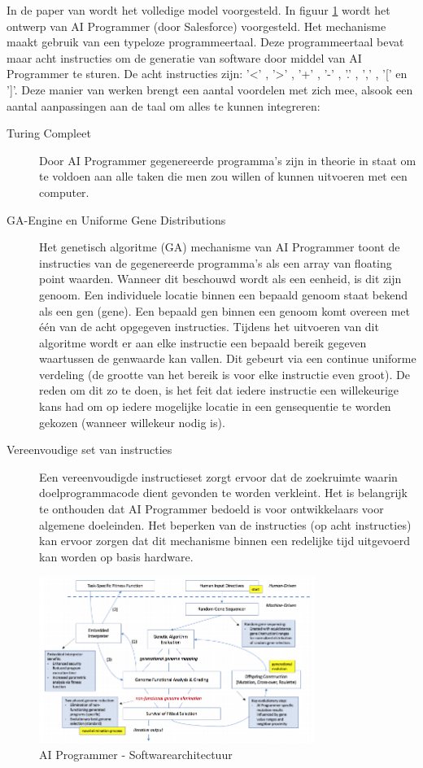 In de paper van \textcite{aiProgrammer} wordt het volledige model voorgesteld. In figuur \ref{fig:aiprog} wordt het ontwerp van AI Programmer (door Salesforce) voorgesteld. Het mechanisme maakt gebruik van een typeloze programmeertaal. Deze programmeertaal bevat maar acht instructies om de generatie van software door middel van AI Programmer te sturen. De acht instructies zijn: '<' , '>' , '+' , '-' , '.' , ',' , '[' en ']'. Deze manier van werken brengt een aantal voordelen met zich mee, alsook een aantal aanpassingen aan de taal om alles te kunnen integreren:
\begin{description}
	\item[Turing Compleet] Door AI Programmer gegenereerde programma’s zijn in theorie in staat om te voldoen aan alle taken die men zou willen of kunnen uitvoeren met een computer.
	\item[GA-Engine en Uniforme Gene Distributions] Het genetisch algoritme (GA) mechanisme van AI Programmer toont de instructies van de gegenereerde programma’s als een array van floating point waarden. Wanneer dit beschouwd wordt als een eenheid, is dit zijn genoom. Een individuele locatie binnen een bepaald genoom staat bekend als een gen (gene). Een bepaald gen binnen een genoom komt overeen met één van de acht opgegeven instructies. Tijdens het uitvoeren van dit algoritme wordt er aan elke instructie een bepaald bereik gegeven waartussen de genwaarde kan vallen. Dit gebeurt via een continue uniforme verdeling (de grootte van het bereik is voor elke instructie even groot). De reden om dit zo te doen, is het feit dat iedere instructie een willekeurige kans had om op iedere mogelijke locatie in een gensequentie te worden gekozen (wanneer willekeur nodig is).
	\item[Vereenvoudige set van instructies]  Een vereenvoudigde instructieset zorgt ervoor dat de zoekruimte waarin doelprogrammacode dient gevonden te worden verkleint. Het is belangrijk te onthouden dat AI Programmer bedoeld is voor ontwikkelaars voor algemene doeleinden. Het beperken van de instructies (op acht instructies) kan ervoor zorgen dat dit mechanisme binnen een redelijke tijd uitgevoerd kan worden op basis hardware.
\end{description}

\begin{figure}[htb]
	\centering
	\includegraphics[width=0.80\textwidth]{img/aiprogmodel}
	\caption[AI Programmer Model]{AI Programmer - Softwarearchitectuur}
	\label{fig:aiprog}
\end{figure}
\break 

